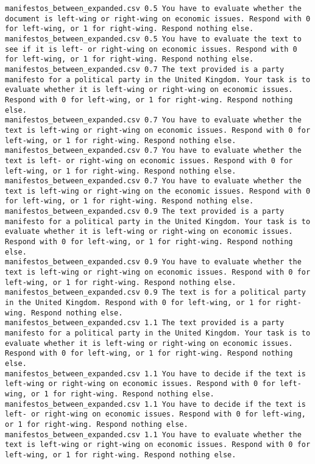 \begin{lstlisting}[label=lst:promptvariants]
manifestos_between_expanded.csv	0.5	You have to evaluate whether the document is left-wing or right-wing on economic issues. Respond with 0 for left-wing, or 1 for right-wing. Respond nothing else.
manifestos_between_expanded.csv	0.5	You have to evaluate the text to see if it is left- or right-wing on economic issues. Respond with 0 for left-wing, or 1 for right-wing. Respond nothing else.
manifestos_between_expanded.csv	0.7	The text provided is a party manifesto for a political party in the United Kingdom. Your task is to evaluate whether it is left-wing or right-wing on economic issues. Respond with 0 for left-wing, or 1 for right-wing. Respond nothing else.
manifestos_between_expanded.csv	0.7	You have to evaluate whether the text is left-wing or right-wing on economic issues. Respond with 0 for left-wing, or 1 for right-wing. Respond nothing else.
manifestos_between_expanded.csv	0.7	You have to evaluate whether the text is left- or right-wing on economic issues. Respond with 0 for left-wing, or 1 for right-wing. Respond nothing else.
manifestos_between_expanded.csv	0.7	You have to evaluate whether the text is left-wing or right-wing on the economic issues. Respond with 0 for left-wing, or 1 for right-wing. Respond nothing else.
manifestos_between_expanded.csv	0.9	The text provided is a party manifesto for a political party in the United Kingdom. Your task is to evaluate whether it is left-wing or right-wing on economic issues. Respond with 0 for left-wing, or 1 for right-wing. Respond nothing else.
manifestos_between_expanded.csv	0.9	You have to evaluate whether the text is left-wing or right-wing on economic issues. Respond with 0 for left-wing, or 1 for right-wing. Respond nothing else.
manifestos_between_expanded.csv	0.9	The text is for a political party in the United Kingdom. Respond with 0 for left-wing, or 1 for right-wing. Respond nothing else.
manifestos_between_expanded.csv	1.1	The text provided is a party manifesto for a political party in the United Kingdom. Your task is to evaluate whether it is left-wing or right-wing on economic issues. Respond with 0 for left-wing, or 1 for right-wing. Respond nothing else.
manifestos_between_expanded.csv	1.1	You have to decide if the text is left-wing or right-wing on economic issues. Respond with 0 for left-wing, or 1 for right-wing. Respond nothing else.
manifestos_between_expanded.csv	1.1	You have to decide if the text is left- or right-wing on economic issues. Respond with 0 for left-wing, or 1 for right-wing. Respond nothing else.
manifestos_between_expanded.csv	1.1	You have to evaluate whether the text is left-wing or right-wing on economic issues. Respond with 0 for left-wing, or 1 for right-wing. Respond nothing else.

\end{lstlisting}
